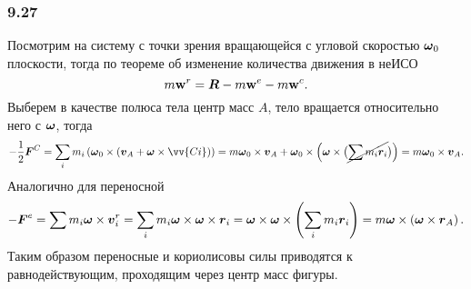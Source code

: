 \subsubsection*{9.27}
Посмотрим на систему с точки зрения вращающейся с угловой скоростью $\mbox{\boldmath $\omega$}_0$ плоскости, тогда по теореме об изменение количества движения в неИСО
\begin{equation}
    m \mbox{\boldmath $\mathrm{w}$}^r = \mbox{\boldmath $R$} - m \mbox{\boldmath $\mathrm{w}$}^e - m \mbox{\boldmath $\mathrm{w}$}^c.
\end{equation}
Выберем в качестве полюса тела центр масс $A$, тело вращается относительно него с $\mbox{\boldmath $\omega$}$, тогда 
$$
    - \frac{1}{2} \vc{F}^C  = 
    \sum_i m_i \left(
        \vc{\omega}_0 \times (\vc{v}_A + \vc{\omega} \times \vv{Ci})
    \right) = m \vc{\omega}_0 \times \vc{v}_A +
    \vc{\omega}_0 \times \left(
        \vc{\omega} \times \big(
        \cancel{\sum m_i \vc{r}_i}
        \big)
    \right) = m \vc{\omega}_0 \times \vc{v}_A.
$$
Аналогично для переносной
$$
    -\mbox{\boldmath $F$}^e = \sum m_i \mbox{\boldmath $\omega$} \times \mbox{\boldmath $v$}_i^r =
    \sum_i m_i \mbox{\boldmath $\omega$} \times \mbox{\boldmath $\omega$} \times \mbox{\boldmath $r$}_i =
    \mbox{\boldmath $\omega$} \times \mbox{\boldmath $\omega$} \times \left(
        \sum_i m_i \mbox{\boldmath $r$}_i
    \right) = m \mbox{\boldmath $\omega$} \times \left(\mbox{\boldmath $\omega$} \times \mbox{\boldmath $r$}_A\right).
$$
Таким образом переносные и кориолисовы силы приводятся к равнодействующим, проходящим через центр масс фигуры.